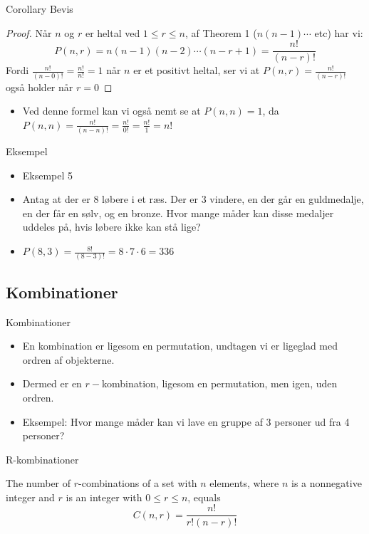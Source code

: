 \documentclass{beamer}
\begin{document}
\begin{frame}{Corollary Bevis}
   \begin{proof}
       Når $n$ og $r$ er heltal ved $1 \leq r \leq n$, af Theorem 1 ($n(n-1)\cdots$ etc) har vi:
       $$P(n,r) = n(n-1)(n-2) \cdots (n-r+1) = \frac{n!}{(n-r)!}$$ 
       Fordi $\frac{n!}{(n-0)!} = \frac{n!}{n!} = 1$ når $n$ er et positivt heltal, ser vi at $P(n,r) = \frac{n!}{(n-r)!}$ også holder når $r = 0$
   \end{proof} 
   \begin{itemize}
       \item Ved denne formel kan vi også nemt se at $P(n,n) = 1$, da $P(n,n) = \frac{n!}{(n-n)!} = \frac{n!}{0!} = \frac{n!}{1} = n!$
   \end{itemize}
\end{frame}

\begin{frame}{Eksempel}
   \begin{itemize}
       \item<1-> Eksempel 5
        \item<1-> Antag at der er 8 løbere i et ræs. Der er 3 vindere, en der går en guldmedalje, en der får en sølv, og en bronze. Hvor mange måder kan disse medaljer uddeles på, hvis løbere ikke kan stå lige? 
        \item<2-> $P(8,3) = \frac{8!}{(8-3)!} = 8\cdot7\cdot6 = 336$
   \end{itemize} 
\end{frame}


\subsection{Kombinationer}

\begin{frame}{Kombinationer}
    \begin{itemize}
        \item En kombination er ligesom en permutation, undtagen vi er ligeglad med ordren af objekterne. 
        \item Dermed er en $r-$kombination, ligesom en permutation, men igen, uden ordren. 
        \item Eksempel: Hvor mange måder kan vi lave en gruppe af 3 personer ud fra 4 personer? 
    \end{itemize}
\end{frame}

\begin{frame}{R-kombinationer}
\begin{theorem}
    The number of $r$-combinations of a set with $n$ elements, where $n$ is a nonnegative integer and $r$ is an integer with $0 \leq r \leq n$, equals
    $$C(n,r) = \frac{n!}{r!(n-r)!}$$
\end{theorem}
\end{frame}
\end{document}
